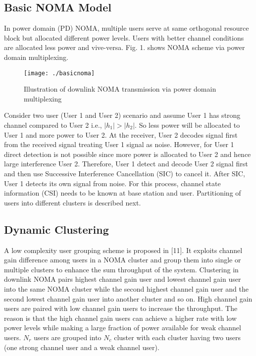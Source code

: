 \documentclass[journal]{IEEEtran}
\begin{document}
\subsection{Basic NOMA Model}
In power domain (PD) NOMA, multiple users serve at same orthogonal resource block but allocated different power levels. Users with better channel conditions are allocated less power and vive-versa. Fig. 1. shows NOMA scheme via power domain multiplexing. \\
\begin{figure}[h]
	\centering
	\texttt{[image: ./basicnoma]} 
	\caption{Illustration of downlink NOMA transmission via power domain multiplexing}
\end{figure}
Consider two user (User 1 and User 2) scenario and assume User 1 has strong channel compared to User 2 i.e., $|h_1| > |h_2|$. So less power will be allocated to User 1 and more power to User 2. At the receiver, User 2 decodes signal first from the received signal treating User 1 signal as noise. However, for User 1 direct detection is not possible since more power is allocated to User 2 and hence large interference User 2. Therefore, User 1 detect and decode User 2 signal first and then use Successive Interference Cancellation (SIC) to cancel it. After SIC, User 1 detects its own signal from noise. For this process, channel state information (CSI) needs to be known at base station and user. Partitioning of users into different clusters is described next.

\subsection{Dynamic Clustering}

A low complexity user grouping scheme is proposed in [11]. It exploits channel gain difference among users in a NOMA cluster and group them into single or multiple clusters to enhance the sum throughput of the system. Clustering in downlink NOMA pairs highest channel gain user and lowest channel gain user into the same NOMA cluster while the second highest channel gain user and the second lowest channel gain user into another cluster and so on. High channel gain users are paired with low channel gain users to increase the throughput.
The reason is that the high channel gain users can achieve a higher rate with low power levels while making a large fraction of power available for weak channel users. $N_r$ users are grouped into $N_c$ cluster with each cluster having two users (one strong channel user and a weak channel user).
\end{document}
